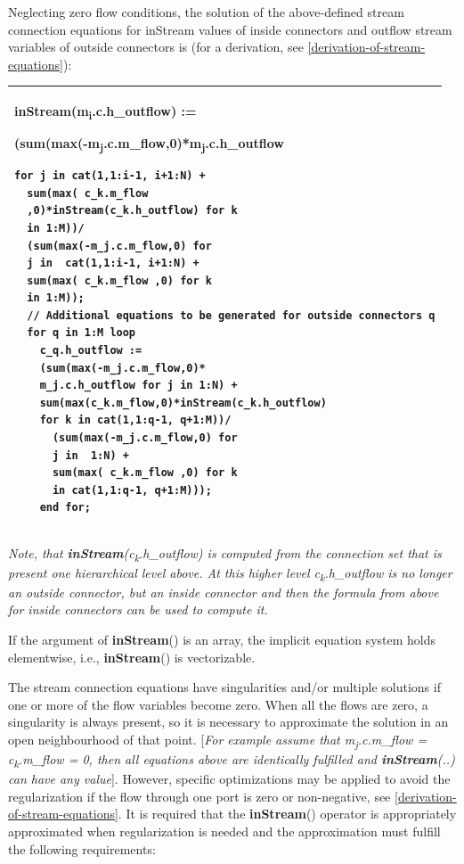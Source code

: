 \documentclass[10pt,a4paper]{report}
\begin{document}
Neglecting zero flow conditions, the solution of the above-defined
stream connection equations for inStream values of inside connectors and
outflow stream variables of outside connectors is (for a derivation, see
\ref{derivation-of-stream-equations}):

\begin{longtable}[]{@{}l@{}}
\hline
\endhead
\begin{minipage}[t]{0.97\columnwidth}\raggedright
\textbf{inStream}(m\textsubscript{i}.c.h\_outflow) :=

(\textbf{sum}(\textbf{max}(-m\textsubscript{j}.c.m\_flow,0)*m\textsubscript{j}.c.h\_outflow
\begin{lstlisting}[language=modelica]
for j in cat(1,1:i-1, i+1:N) +
  sum(max( c_k.m_flow
  ,0)*inStream(c_k.h_outflow) for k
  in 1:M))/
  (sum(max(-m_j.c.m_flow,0) for
  j in  cat(1,1:i-1, i+1:N) +
  sum(max( c_k.m_flow ,0) for k
  in 1:M));
  // Additional equations to be generated for outside connectors q
  for q in 1:M loop
    c_q.h_outflow :=
    (sum(max(-m_j.c.m_flow,0)*
    m_j.c.h_outflow for j in 1:N) +
    sum(max(c_k.m_flow,0)*inStream(c_k.h_outflow)
    for k in cat(1,1:q-1, q+1:M))/
      (sum(max(-m_j.c.m_flow,0) for
      j in  1:N) +
      sum(max( c_k.m_flow ,0) for k
      in cat(1,1:q-1, q+1:M)));
    end for;
\end{lstlisting}
\end{minipage}\\ \hline

\end{longtable}

\emph{Note, that \textbf{inStream}(c\textsubscript{k}.h\_outflow) is
computed from the connection set that is present one hierarchical level
above. At this higher level c\textsubscript{k}.h\_outflow is no longer
an outside connector, but an inside connector and then the formula from
above for inside connectors can be used to compute it.}

If the argument of \textbf{inStream}() is an array, the implicit
equation system holds elementwise, i.e., \textbf{inStream}() is
vectorizable.

The stream connection equations have singularities and/or multiple
solutions if one or more of the flow variables become zero. When all the
flows are zero, a singularity is always present, so it is necessary to
approximate the solution in an open neighbourhood of that point.
{[}\emph{For example assume that m\textsubscript{j}.c.m\_flow =
c\textsubscript{k}.m\_flow = 0, then all equations above are identically
fulfilled and \textbf{inStream}(..) can have any value}{]}. However,
specific optimizations may be applied to avoid the regularization if the
flow through one port is zero or non-negative, see \ref{derivation-of-stream-equations}. It is
required that the \textbf{inStream}() operator is appropriately
approximated when regularization is needed and the approximation must
fulfill the following requirements:
\end{document}
